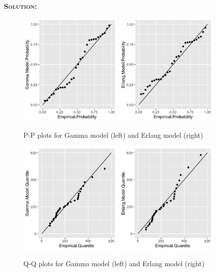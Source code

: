 \documentclass[12pt,oneside]{article}
\newenvironment{solution}
    {\textbf{\textsc{Solution:}}\\}
    {\newpage}
\begin{document}
\begin{solution}
\begin{figure}[H]
\begin{center}
{\includegraphics[width=2in]{a1/gamma-pp.png}}
{\includegraphics[width=2in]{a1/erlang-pp.png}}
\caption{P-P plots for Gamma model (left) and Erlang model (right)}
\end{center}
\end{figure}

\begin{figure}[H]
\begin{center}
{\includegraphics[width=2in]{a1/gamma-qq.png}}
{\includegraphics[width=2in]{a1/erlang-qq.png}}
\caption{Q-Q plots for Gamma model (left) and Erlang model (right)}
\end{center}
\end{figure}


\end{solution}
\end{document}
